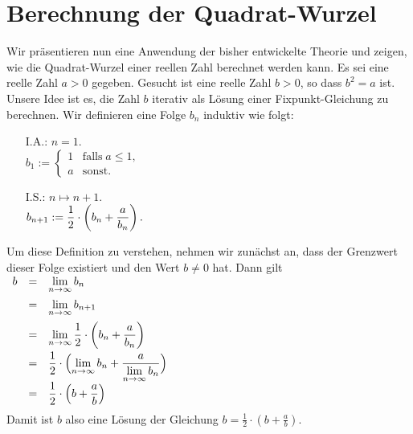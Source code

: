 \section{Berechnung der Quadrat-Wurzel}
Wir pr\"asentieren nun eine Anwendung der bisher entwickelte Theorie und zeigen, wie die
Quadrat-Wurzel einer reellen Zahl berechnet werden kann.  Es sei eine reelle Zahl $a>0$
gegeben.  Gesucht ist eine reelle Zahl $b>0$, so dass $b^2 = a$ ist. Unsere Idee ist es,
die Zahl $b$ iterativ als L\"osung einer Fixpunkt-Gleichung zu berechnen.  
Wir definieren eine Folge $b_n$ induktiv wie folgt:
\begin{enumerate}
\item[I.A.:] $n=1$.  
      \\[0.2cm]
      \hspace*{1.3cm}      
      $b_1 := \left\{ \begin{array}{ll}
                      1 & \mbox{falls}\; a \leq 1, \\
                      a & \mbox{sonst}.
               \end{array}\right.
      $
\item[I.S.:] $n \mapsto n+1$.
      \\[0.2cm]
\hspace*{1.3cm}
$\displaystyle b_{n+1} := \frac{1}{2}\cdot  \left(b_n + \frac{a}{b_n}\right). $
\end{enumerate}
Um diese Definition zu verstehen, nehmen wir zun\"achst an, dass der Grenzwert dieser Folge
existiert und den Wert $b \not= 0$ hat.  Dann gilt
\\[0.2cm]
\hspace*{1.3cm}
$ \begin{array}{lcl}
   b & = &  \lim\limits_{n\rightarrow\infty} b_n     \\[0.3cm]
     & = &\lim\limits_{n\rightarrow\infty} b_{n+1}   \\[0.3cm]
     & = & \displaystyle\lim\limits_{n\rightarrow\infty} \frac{1}{2}\cdot  \left(b_n + \frac{a}{b_n}\right) \\[0.3cm]
     & = & \displaystyle\frac{1}{2}\cdot  \Bigl(\lim\limits_{n\rightarrow\infty} b_n + \frac{a}{\lim\limits_{n\rightarrow\infty}b_n}\Bigr) \\[0.3cm]
     & = & \displaystyle\frac{1}{2}\cdot  \left(b + \frac{a}{b}\right) \\[0.3cm]
\end{array}
$
\\[0.2cm]
Damit ist $b$ also eine L\"osung der Gleichung 
$b = \frac{1}{2}\cdot  \left(b + \frac{a}{b}\right)$.  
